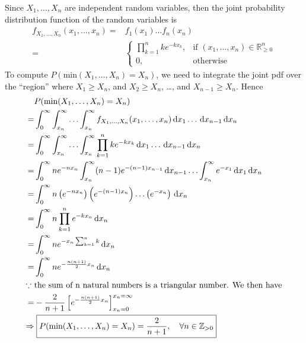 \documentclass{mthe353answer}
\begin{document}
\begin{questions}
  \setcounter{question}{4}
  \question{}
  Since \(X_1,\ldots,X_n\) are independent random variables, then the joint
  probability distribution function of the random variables is 
  \begin{align*}
    f_{X_1,\ldots,X_n}(x_1,\ldots,x_n) =& f_1(x_1)\ldots f_n(x_n)\\
    =&
    \begin{cases}
      \prod_{k=1}^{n} ke^{-kx_k}, & \text{if } (x_1,\dots,x_n) \in \mathbb{R}_{\ge0}^{n}\\
      0, & \text{otherwise}
    \end{cases}
  \end{align*}
  To compute \(P(\text{min}(X_1,\ldots,X_n)=X_n)\), we need to integrate the 
  joint pdf over the ``region'' where \(X_1 \ge X_n\), and \(X_2 \ge X_n\),
  \ldots, and \(X_{n-1} \ge X_n\). Hence
  \begin{align*}
    & P(\text{min}(X_1,\ldots,X_n)=X_n)\\
    =& \int_{0}^{\infty}\int_{x_n}^{\infty}\ldots\int_{x_n}^{\infty} f_{X_1,\ldots,X_n}(x_1,\ldots,x_n)
      \, \mathrm{d}x_1\ldots \, \mathrm{d}x_{n-1} \, \mathrm{d}x_n\\
    =& \int_{0}^{\infty}\int_{x_n}^{\infty}\ldots\int_{x_n}^{\infty} 
      \prod_{k=1}^{n} ke^{-kx_k}
      \, \mathrm{d}x_1\ldots \, \mathrm{d}x_{n-1} \, \mathrm{d}x_n\\
    =& \int_{0}^{\infty} ne^{-nx_n} \int_{x_n}^{\infty} (n-1)e^{-(n-1)x_{n-1}} \, \mathrm{d}x_{n-1} \ldots \int_{x_n}^{\infty} e^{-x_1} 
      \, \mathrm{d}x_1 \, \mathrm{d}x_n\\
    =& \int_{0}^{\infty} n\left(e^{-nx_n}\right) \left(e^{-(n-1)x_n}\right) \ldots \left(e^{-x_n}\right) \, \mathrm{d}x_n\\
    =& \int_{0}^{\infty} n \prod_{k=1}^{n} e^{-kx_n} \, \mathrm{d}x_n\\
    =& \int_{0}^{\infty} n e^{-x_n\sum_{k=1}^{n}k} \, \mathrm{d}x_n\\
    =& \int_{0}^{\infty} n e^{-\frac{n(n+1)}{2}x_n} \, \mathrm{d}x_n\\
    \intertext{\(\because\) the sum of n natural numbers is a triangular number. We then have}
    =& -\frac{2}{n+1}\left[e^{-\frac{n(n+1)}{2}x_n}\right]_{x_n=0}^{x_n=\infty}\\
    \Rightarrow &\; \boxed{P(\text{min}(X_1,\ldots,X_n)=X_n) = \frac{2}{n+1},\quad \forall n \in \mathbb{Z}_{>0} }
  \end{align*}


\end{questions}
\end{document}
